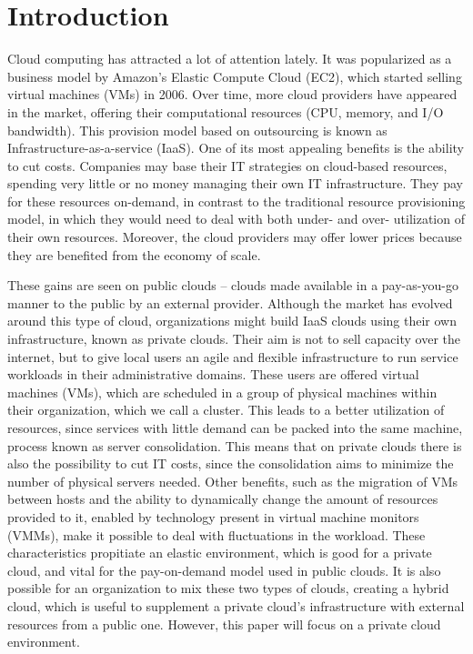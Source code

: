 \chapter{\textbf{Introduction}}

\label{Introduction}

Cloud computing has attracted a lot of attention lately. It was popularized as a business model by Amazon's Elastic Compute Cloud (EC2), which started selling virtual machines (VMs) in 2006. Over time, more cloud providers have appeared in the market, offering their computational resources (CPU, memory, and I/O bandwidth). This provision model based on outsourcing is known  as Infrastructure-as-a-service (IaaS). One of its most appealing benefits is the ability to cut costs. Companies may base their IT strategies on cloud-based resources, spending very little or no money managing their own IT infrastructure. They pay for these resources on-demand, in contrast to the traditional resource provisioning model, in which they would need to deal with both under- and over- utilization of their own resources. Moreover, the cloud providers may offer lower prices because they are benefited from the economy of 
scale.


These gains are seen on public clouds -- clouds made available in a pay-as-you-go manner to the public by an external provider. Although the market has evolved around this type of cloud, organizations might build IaaS clouds using their own infrastructure, known as private clouds. Their aim is not to sell capacity  over the internet,  but to give local users an agile and flexible infrastructure to run service workloads in their administrative domains. These users are offered virtual machines (VMs), which are scheduled in a group of physical machines within their organization, which we call a cluster. This leads to a better utilization of resources, since services with little demand can be packed into the same machine, process known as server consolidation. This means that on private clouds there is also the possibility to cut IT costs, since the consolidation aims to minimize the number of physical servers needed. Other benefits, such as the migration of VMs between hosts and the ability to dynamically change the 
amount of resources provided to it, enabled by technology present in virtual machine monitors (VMMs), make it 
possible to deal with fluctuations in the workload. These characteristics propitiate an elastic environment, which is good for a private cloud, and vital for the pay-on-demand model used in public clouds.  It is also possible for an organization to mix these two types of clouds, creating a hybrid cloud,  which is useful to supplement a private cloud's infrastructure with external resources from a public one. However, this paper will focus on a private cloud environment. 

